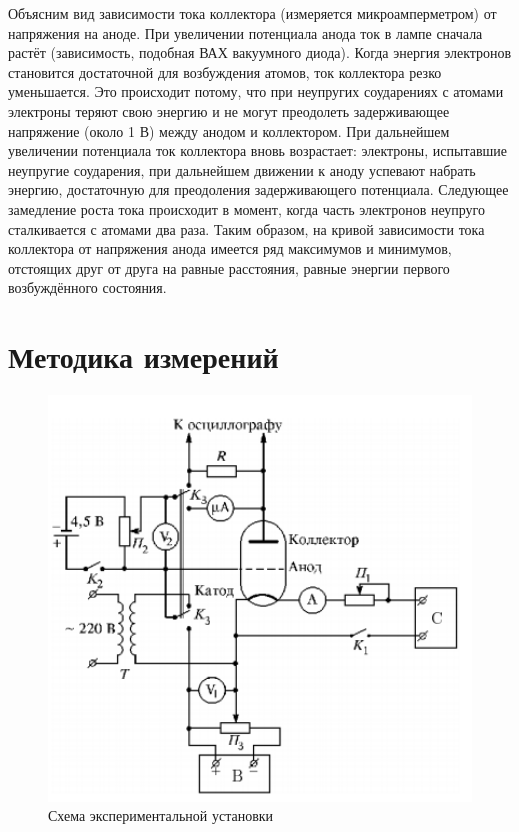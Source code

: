 \documentclass[a4paper, 12pt]{article}
\begin{document}
Объясним вид зависимости тока коллектора (измеряется микроамперметром) от напряжения на аноде. При увеличении потенциала анода ток в лампе сначала растёт (зависимость, подобная ВАХ вакуумного диода). Когда энергия электронов становится достаточной для возбуждения атомов, ток коллектора резко уменьшается. Это происходит потому, что при неупругих соударениях с атомами электроны теряют свою энергию и не могут преодолеть задерживающее напряжение (около 1 В) между анодом и коллектором. При дальнейшем увеличении потенциала ток коллектора вновь возрастает: электроны, испытавшие неупругие соударения, при дальнейшем движении к аноду успевают набрать энергию, достаточную для преодоления задерживающего потенциала. Следующее замедление роста тока происходит в момент, когда часть электронов неупруго сталкивается с атомами два раза. Таким образом, на кривой зависимости тока коллектора от напряжения анода имеется ряд максимумов и минимумов, отстоящих друг от друга на равные расстояния, равные энергии первого возбуждённого состояния.

\section{Методика измерений}

\begin{figure}[h]
    \centering
    \includegraphics[width=12cm]{fig3.PNG}
    \caption{Схема экспериментальной установки}
    \label{fig:vac}
\end{figure}
\end{document}
